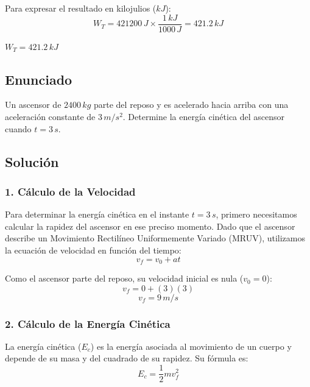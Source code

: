 \documentclass[12pt, a4paper]{article}
\begin{document}
Para expresar el resultado en kilojulios ($\si{kJ}$):
$$ W_T = 421200 \, \si{J} \times \frac{1 \, \si{kJ}}{1000 \, \si{J}} = 421.2 \, \si{kJ} $$

\begin{tcolorbox}[colback=green!5!white, colframe=green!50!black, title=Respuesta Final]
\centering \Large $W_T = 421.2 \, \si{kJ}$
\end{tcolorbox}

\newpage

\subsection*{Enunciado}
Un ascensor de $2400 \, \si{kg}$ parte del reposo y es acelerado hacia arriba con una aceleración constante de $3 \, \si{m/s^2}$. Determine la energía cinética del ascensor cuando $t = 3 \, \si{s}$.

\begin{center}
\end{center}

\subsection*{Solución}

\subsubsection*{1. Cálculo de la Velocidad}
Para determinar la energía cinética en el instante $t = 3 \, \si{s}$, primero necesitamos calcular la rapidez del ascensor en ese preciso momento. Dado que el ascensor describe un Movimiento Rectilíneo Uniformemente Variado (MRUV), utilizamos la ecuación de velocidad en función del tiempo:
$$v_f = v_0 + a t$$

Como el ascensor parte del reposo, su velocidad inicial es nula ($v_0 = 0$):
$$v_f = 0 + (3)(3)$$
$$v_f = 9 \, \si{m/s}$$

\subsubsection*{2. Cálculo de la Energía Cinética}
La energía cinética ($E_c$) es la energía asociada al movimiento de un cuerpo y depende de su masa y del cuadrado de su rapidez. Su fórmula es:
$$E_c = \frac{1}{2} m v_f^2$$
\end{document}
